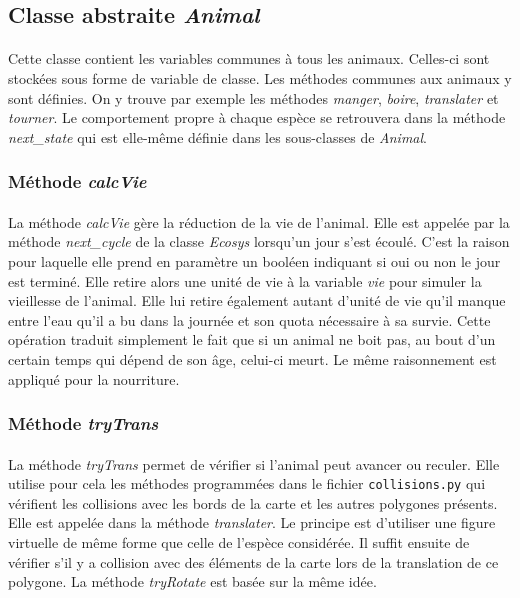 \documentclass[a4paper,11pt,final,oneside]{article}
\begin{document}
		\subsection{Classe abstraite \textit{Animal}}
		
\paragraph{} Cette classe contient les variables communes à tous les animaux. Celles-ci sont stockées sous forme de variable de classe. Les méthodes communes aux animaux y sont définies. On y trouve par exemple les méthodes \textit{manger}, \textit{boire}, \textit{translater} et \textit{tourner}. Le comportement propre à chaque espèce se retrouvera dans la méthode \textit{next\_state} qui est elle-même définie dans les sous-classes de \textit{Animal}.

			\subsubsection{Méthode \textit{calcVie}}
			
\paragraph{} La méthode \textit{calcVie} gère la réduction de la vie de l'animal. Elle est appelée par la méthode \textit{next\_cycle} de la classe \textit{Ecosys} lorsqu'un jour s'est écoulé. C'est la raison pour laquelle elle prend en paramètre un booléen indiquant si oui ou non le jour est terminé. Elle retire alors une unité de vie à la variable \textit{vie} pour simuler la vieillesse de l'animal. Elle lui retire également autant d'unité de vie qu'il manque entre l'eau qu'il a bu dans la journée et son quota nécessaire à sa survie. Cette opération traduit simplement le fait que si un animal ne boit pas, au bout d'un certain temps qui dépend de son âge, celui-ci meurt. Le même raisonnement est appliqué pour la nourriture.

			\subsubsection{Méthode \textit{tryTrans}}

\paragraph{} La méthode \textit{tryTrans} permet de vérifier si l'animal peut avancer ou reculer. Elle utilise pour cela les méthodes programmées dans le fichier \texttt{collisions.py} qui vérifient les collisions avec les bords de la carte et les autres polygones présents. Elle est appelée dans la méthode \textit{translater}. Le principe est d'utiliser une figure virtuelle de même forme que celle de l'espèce considérée. Il suffit ensuite de vérifier s'il y a collision avec des éléments de la carte lors de la translation de ce polygone. La méthode \textit{tryRotate} est basée sur la même idée.
\end{document}

